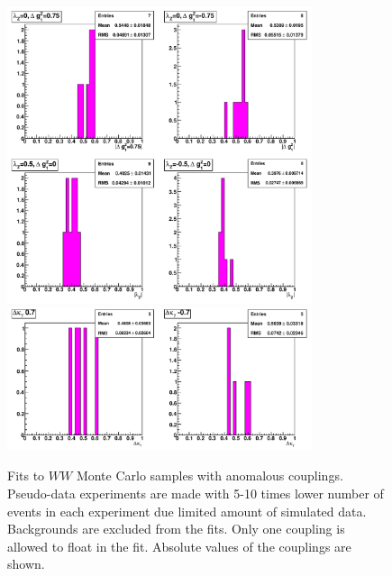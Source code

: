 

\begin{figure}[tp]
  \centering
    \includegraphics[width=0.8\textwidth]{figures/fit_wwATGC_mc_1D_abs}
    \includegraphics[width=0.8\textwidth]{figures/fit_wwATGC_mc_1D_abs2}

  \caption[1D fits to WW aTGC Monte Carlo] {Fits to $WW$ Monte Carlo
    samples with anomalous couplings. Pseudo-data experiments are made
    with 5-10 times lower number of events in each experiment due
    limited amount of simulated data. Backgrounds are excluded from
    the fits. Only one coupling is allowed to float in the
    fit. Absolute values of the couplings are  shown.}  
    \label{fig:fit_wwATGC_mc_1D_abs}
\end{figure}

